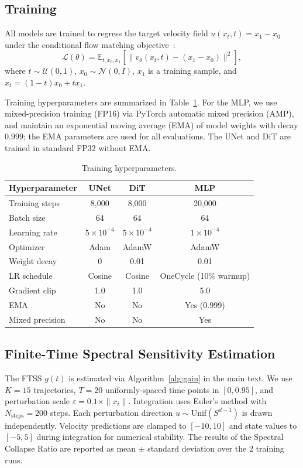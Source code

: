 \documentclass[11pt]{article}
\begin{document}
\subsection{Training}

All models are trained to regress the target velocity field $u(x_t, t) = x_1 - x_0$ under the conditional flow matching objective~\cite{lipmanflow}:
\begin{equation}
\mathcal{L}(\theta) = \mathbb{E}_{t, x_0, x_1}\left[\|v_\theta(x_t, t) - (x_1 - x_0)\|^2\right],
\end{equation}
where $t \sim \mathcal{U}(0,1)$, $x_0 \sim \mathcal{N}(0, I)$, $x_1$ is a training sample, and $x_t = (1-t)x_0 + t x_1$.

Training hyperparameters are summarized in Table~\ref{tab:training}. 
For the MLP, we use mixed-precision training (FP16) via PyTorch automatic 
mixed precision (AMP), and maintain an exponential moving average (EMA) of 
model weights with decay $0.999$; the EMA parameters are used for all 
evaluations. The UNet and DiT are trained in standard FP32 without EMA.

\begin{table}[htbp]
\centering
\caption{Training hyperparameters.}
\label{tab:training}
\begin{tabular}{@{}lccc@{}}
\toprule
Hyperparameter & UNet & DiT & MLP \\
\midrule
Training steps & 8,000 & 8,000 & 20,000 \\
Batch size & 64 & 64 & 64 \\
Learning rate & $5\times10^{-4}$ & $5\times10^{-4}$ & $1\times10^{-4}$\\
Optimizer & Adam & AdamW & AdamW \\
Weight decay & 0 & 0.01 & 0.01 \\
LR schedule & Cosine & Cosine & OneCycle (10\% warmup) \\
Gradient clip & 1.0 & 1.0 & 5.0 \\
EMA & No & No & Yes (0.999) \\
Mixed precision & No & No & Yes \\
\bottomrule
\end{tabular}
\end{table}

\subsection{Finite-Time Spectral Sensitivity Estimation}

The FTSS $g(t)$ is estimated via Algorithm~\ref{alg:gain} in the main text. We use $K = 15$ trajectories, $T = 20$ uniformly-spaced time points in $[0, 0.95]$, and perturbation scale $\varepsilon = 0.1 \times \|x_t\|$. Integration uses Euler's method with $N_{\text{steps}} = 200$ steps. Each perturbation direction $u \sim \text{Unif}(S^{d-1})$ is drawn independently. Velocity predictions are clamped to $[-10, 10]$ and state values to $[-5, 5]$ during integration for numerical stability. The results of the Spectral Collapse Ratio are reported as mean $\pm$ standard deviation over the $2$ training runs.
\end{document}
